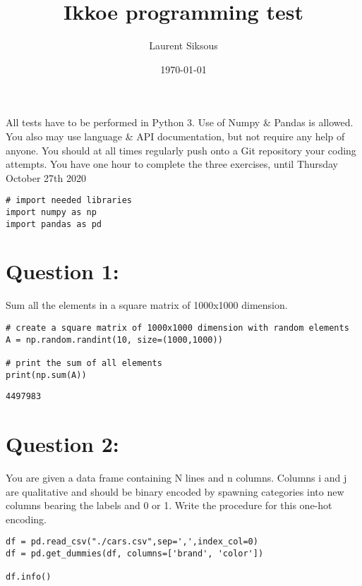 \documentclass[11pt]{article}
\author{Laurent Siksous}
\date{\today}
\title{Ikkoe programming test}
\begin{document}
\maketitle
All tests have to be performed in Python 3. Use of Numpy \& Pandas is allowed. You also may use 
language \& API documentation, but not require any help of anyone.
You should at all times regularly push onto a Git repository your coding attempts.
You have one hour to complete the three exercises, until Thursday October 27th 2020

\begin{verbatim}
# import needed libraries
import numpy as np
import pandas as pd 
\end{verbatim}

\section{Question 1:}
\label{sec:org223e3ff}
Sum all the elements in a square matrix of 1000x1000 dimension.

\begin{verbatim}
# create a square matrix of 1000x1000 dimension with random elements
A = np.random.randint(10, size=(1000,1000))

# print the sum of all elements
print(np.sum(A))
\end{verbatim}

\begin{verbatim}
4497983
\end{verbatim}

\section{Question 2:}
\label{sec:orgb63b38c}
You are given a data frame containing N lines and n columns. Columns i and j are qualitative and 
should be binary encoded by spawning categories into new columns bearing the labels and 0 or 1. 
Write the procedure for this one-hot encoding.

\begin{verbatim}
df = pd.read_csv("./cars.csv",sep=',',index_col=0)
df = pd.get_dummies(df, columns=['brand', 'color'])

df.info()
\end{verbatim}
\end{document}
